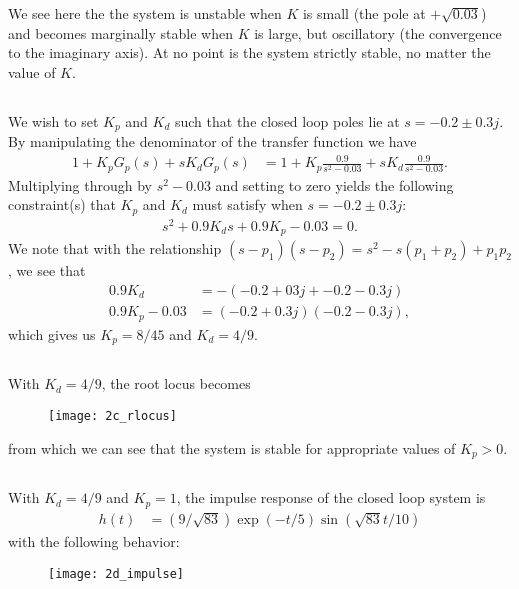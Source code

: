 \documentclass[paper=letter, fontsize=11pt]{scrartcl} %
\numberwithin{equation}{section} %
\numberwithin{figure}{section} %
\numberwithin{table}{section} %
\begin{document}
We see here the the system is unstable when $K$ is small (the pole at $+\sqrt{0.03}$)
and becomes marginally stable when $K$ is large, but oscillatory 
(the convergence to the imaginary axis). 
At no point is the system strictly stable, no matter the value of $K$.

\subsection{}
We wish to set $K_p$ and $K_d$ such that the closed loop poles lie at $s = -0.2 \pm 0.3j$.
By manipulating the denominator of the transfer function we have
\begin{align*}
1 + K_pG_p(s) + sK_dG_p(s) &= 1 + K_p \frac{0.9}{s^2 - 0.03} + sK_d\frac{0.9}{s^2 - 0.03}.
\end{align*}
Multiplying through by $s^2 - 0.03$ and setting to zero yields the following constraint(s)
that $K_p$ and $K_d$ must satisfy when $s = -0.2 \pm 0.3j$:
\begin{align*}
s^2 + 0.9K_ds + 0.9K_p - 0.03 = 0.
\end{align*}
We note that with the relationship $(s - p_1)(s - p_2) = s^2 - s(p_1 + p_2) + p_1p_2$, we see
that
\begin{align*}
0.9K_d &= - (-0.2 + 03j + -0.2 - 0.3j) \\
0.9K_p - 0.03 &= (-0.2 + 0.3j)(-0.2 - 0.3j),
\end{align*}
which gives us $K_p = 8/45$ and $K_d = 4/9$.

\subsection{}
With $K_d = 4/9$, the root locus becomes
\begin{figure}[h!]
  \centering
  \texttt{[image: 2c\_rlocus]}
\end{figure}

from which we can see that the system is stable for appropriate values of $K_p > 0$.

\subsection{}
With $K_d = 4/9$ and $K_p = 1$, the impulse response of the closed loop system is
\begin{align*}
h(t) &= (9/\sqrt{83}) \exp(-t/5) \sin(\sqrt{83}t/10)
\end{align*}
with the following behavior:
\begin{figure}[h!]
  \centering
  \texttt{[image: 2d\_impulse]}
\end{figure}
\end{document}

